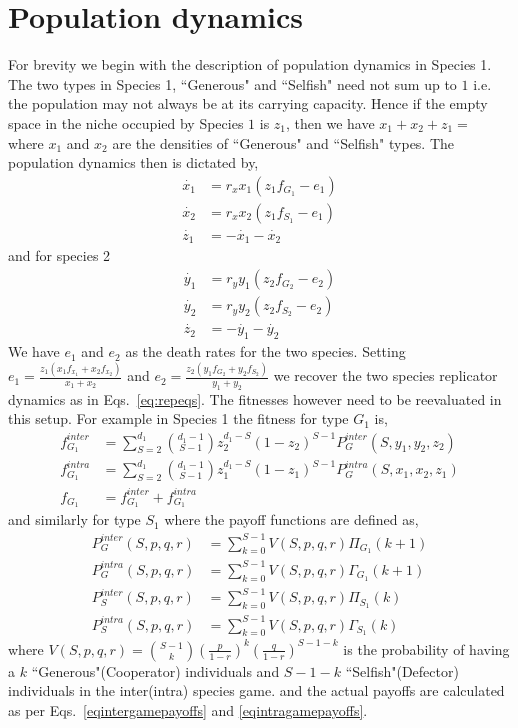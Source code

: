 \documentclass[times,onecolumn]{scrartcl}
\begin{document}
\section*{Population dynamics}

For brevity we begin with the description of population dynamics in Species 1.
The two types in Species 1, ``Generous" and ``Selfish" need not sum up to $1$ i.e. the population may not always be at its carrying capacity.
Hence if the empty space in the niche occupied by Species $1$ is $z_1$, then we have $x_1 + x_2 + z_1 = $ where $x_1$ and $x_2$ are the densities of ``Generous" and ``Selfish" types.
The population dynamics then is dictated by,
%
\begin{align}
	\dot{x_1} &= r_x x_1 (z_1 f_{G_1} - e_1) \\
	\dot{x_2} &= r_x x_2 (z_1 f_{S_1} - e_1) \\
	\dot{z_1} &= - \dot{x_1} - \dot{x_2}
\end{align}
%
and for species 2
\begin{align}
	\dot{y_1} &= r_y y_1 (z_2 f_{G_2} - e_2) \\
	\dot{y_2} &= r_y y_2 (z_2 f_{S_2} - e_2) \\
	\dot{z_2} &= - \dot{y_1} - \dot{y_2}
\end{align}
%
We have $e_1$ and $e_2$ as the death rates for the two species.
Setting $e_1 = \frac{z_1 (x_1 f_{x_1} + x_2 f_{x_2}) }{x_1 + x_2}$ and $e_2 = \frac{z_2 (y_1 f_{G_2} + y_2 f_{S_2}) }{y_1 + y_2}$ we recover the two species replicator dynamics as in Eqs.~\ref{eq:repeqs}.
The fitnesses however need to be reevaluated in this setup.
For example in Species 1 the fitness for type $G_1$ is,
%
\begin{align}
	f_{G_1}^{inter} &= \sum_{S=2}^{d_1} \binom{d_1 -1}{S-1} z_2 ^{d_1 -S} (1-z_2)^{S-1} P_G^{inter}(S,y_1,y_2,z_2) \\
	f_{G_1}^{intra} &= \sum_{S=2}^{d_1} \binom{d_1 -1}{S-1} z_1 ^{d_1 -S} (1-z_1)^{S-1} P_G^{intra}(S,x_1,x_2,z_1) \\
	f_{G_1} &= f_{G_1}^{inter} + f_{G_1}^{intra}
\end{align}
%
and similarly for type $S_1$ where the payoff functions are defined as,
%
\begin{align}
	P_G^{inter}(S,p,q,r) &= \sum_{k=0}^{S-1} V(S,p,q,r) \Pi_{G_1}(k+1) \\
	P_G^{intra}(S,p,q,r) &= \sum_{k=0}^{S-1} V(S,p,q,r) \Gamma_{G_1}(k+1) \\
	P_S^{inter}(S,p,q,r) &= \sum_{k=0}^{S-1} V(S,p,q,r) \Pi_{S_1}(k) \\
	P_S^{intra}(S,p,q,r) &= \sum_{k=0}^{S-1} V(S,p,q,r) \Gamma_{S_1}(k)
\end{align}
%
where $V(S,p,q,r) = \binom{S-1}{k} \left( \frac{p}{1-r}\right)^k  \left(\frac{q}{1-r}\right)^{S-1-k}$ is the probability of having a $k$ ``Generous"(Cooperator) individuals and $S-1-k$ ``Selfish"(Defector) individuals in the inter(intra) species game.
and the actual payoffs are calculated as per Eqs.~\ref{eqintergamepayoffs} and \ref{eqintragamepayoffs}.



\end{document}
